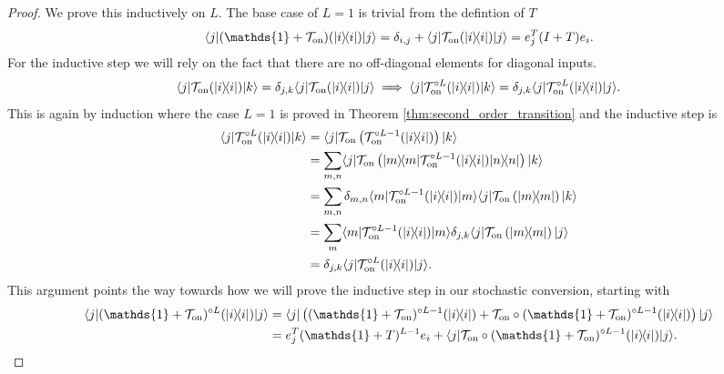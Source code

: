 \documentclass[
 amsmath,amssymb,
 aps,
onecolumn, 
nofootinbib]{revtex4-2}
\newcommand{\on}{\rm on}
\newcommand{\ket}[1]{|#1\rangle}
\newcommand{\bra}[1]{\langle #1|}
\newcommand{\ketbra}[2]{| #1\rangle\! \langle #2|}
\newcommand{\identity}{\mathds{1}}
\begin{document}
\begin{proof}
    We prove this inductively on $L$. The base case of $L = 1$ is trivial from the defintion of $T$
    \begin{align}
    \bra{j} (\identity + \mathcal{T}_{\on})(\ketbra{i}{i}) \ket{j} = \delta_{i,j} + \bra{j} \mathcal{T}_{\on}(\ketbra{i}{i}) \ket{j} = e_j^T (I +  T) e_i.
\end{align}
For the inductive step we will rely on the fact that there are no off-diagonal elements for diagonal inputs. 
\begin{align}
    \bra{j} \mathcal{T}_{\on} (\ketbra{i}{i}) \ket{k} = \delta_{j,k} \bra{j} \mathcal{T}_{\on} (\ketbra{i}{i}) \ket{j} \implies \bra{j} \mathcal{T}_{\on}^{\circ L} (\ketbra{i}{i}) \ket{k} = \delta_{j,k} \bra{j} \mathcal{T}_{\on}^{\circ L} (\ketbra{i}{i}) \ket{j}.
\end{align}
This is again by induction where the case $L = 1$ is proved in Theorem \ref{thm:second_order_transition} and the inductive step is 
\begin{align}
    \bra{j} \mathcal{T}_{\on}^{\circ L} (\ketbra{i}{i}) \ket{k} &= \bra{j} \mathcal{T}_{\on} \left( \mathcal{T}_{\on}^{\circ L - 1} (\ketbra{i}{i}) \right) \ket{k} \\
    &= \sum_{m, n} \bra{j} \mathcal{T}_{\on}\left( \ketbra{m}{m}\mathcal{T}_{\on}^{\circ L - 1}(\ketbra{i}{i}) \ketbra{n}{n}\right) \ket{k} \\
    &= \sum_{m, n} \delta_{m,n} \bra{m}\mathcal{T}_{\on}^{\circ L - 1}(\ketbra{i}{i}) \ket{m} \bra{j} \mathcal{T}_{\on}\left(   \ketbra{m}{m} \right) \ket{k} \\
    &= \sum_{m} \bra{m}\mathcal{T}_{\on}^{\circ L - 1}(\ketbra{i}{i}) \ket{m} \delta_{j,k} \bra{j} \mathcal{T}_{\on}\left(   \ketbra{m}{m} \right) \ket{j} \\
    &= \delta_{j,k} \bra{j} \mathcal{T}_{\on}^{\circ L} (\ketbra{i}{i}) \ket{j}.
\end{align} 
This argument points the way towards how we will prove the inductive step in our stochastic conversion, starting with
\begin{align}
    \bra{j} (\identity + \mathcal{T}_{\on})^{\circ L}(\ketbra{i}{i}) \ket{j} &= \bra{j} \left( (\identity + \mathcal{T}_{\on})^{\circ L - 1} (\ketbra{i}{i}) + \mathcal{T}_{\on} \circ (\identity + \mathcal{T}_{\on})^{\circ L - 1} (\ketbra{i}{i}) \right)\ket{j} \\
    &= e_j^T (\identity + T)^{L - 1} e_i + \bra{j} \mathcal{T}_{\on} \circ (\identity + \mathcal{T}_{\on})^{\circ L - 1} (\ketbra{i}{i}) \ket{j} . \label{eq:matrix_reloaded1}

\end{align}
\end{proof}
\end{document}
